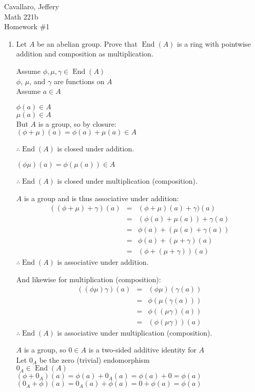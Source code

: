 \documentclass[letterpaper,12pt,fleqn]{article}
\DeclareMathOperator{\End}{End}
\begin{document}
Cavallaro, Jeffery \\
Math 221b \\
Homework \#1

\bigskip

\begin{enumerate}
\item Let $A$ be an abelian group. Prove that $\End(A)$ is a ring with pointwise
  addition and composition as multiplication.

  Assume $\phi,\mu,\gamma\in\End(A)$ \\
  $\phi$, $\mu$, and $\gamma$ are functions on $A$ \\
  Assume $a\in A$

  $\phi(a)\in A$ \\
  $\mu(a)\in A$ \\
  But $A$ is a group, so by closure: \\
  $(\phi+\mu)(a)=\phi(a)+\mu(a)\in A$

  $\therefore\End(A)$ is closed under addition.

  $(\phi\mu)(a)=\phi(\mu(a))\in A$

  $\therefore\End(A)$ is closed under multiplication (composition).

  $A$ is a group and is thus associative under addition:
  \begin{eqnarray*}
    ((\phi+\mu)+\gamma)(a) &=& (\phi+\mu)(a)+\gamma)(a) \\
    &=& (\phi(a)+\mu(a))+\gamma(a) \\
    &=& \phi(a)+(\mu(a)+\gamma(a)) \\
    &=& \phi(a)+(\mu+\gamma)(a) \\
    &=& (\phi+(\mu+\gamma))(a)
  \end{eqnarray*}
  $\therefore\End(A)$ is associative under addition.

  And likewise for multiplication (composition):
  \begin{eqnarray*}
    ((\phi\mu)\gamma)(a) &=& (\phi\mu)(\gamma(a)) \\
    &=& \phi(\mu(\gamma(a))) \\
    &=& \phi((\mu\gamma)(a)) \\
    &=& (\phi(\mu\gamma))(a)
  \end{eqnarray*}
  $\therefore\End(A)$ is associative under multiplication (composition).

  $A$ is a group, so $0\in A$ is a two-sided additive identity for $A$ \\
  Let $0_A$ be the zero (trivial) endomorphism \\
  $0_A\in\End(A)$ \\
  $(\phi+0_A)(a)=\phi(a)+0_A(a)=\phi(a)+0=\phi(a)$ \\
  $(0_A+\phi)(a)=0_A(a)+\phi(a)=0+\phi(a)=\phi(a)$


\end{enumerate}
\end{document}
